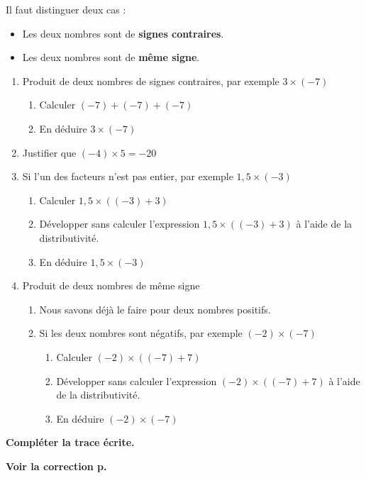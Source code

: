  \label{N1activite003}
\begin{activite}           
    Il faut distinguer deux cas :
    \begin{itemize}
        \item Les deux nombres sont de \textbf{signes contraires}.
        \item Les deux nombres sont de \textbf{même signe}.
    \end{itemize}

    \begin{enumerate}
        \item Produit de deux nombres de signes contraires, par exemple $3\times(-7)$
        \begin{enumerate}
            \item Calculer $(-7)+(-7)+(-7)$
            \item En déduire $3\times (-7)$
        \end{enumerate}
        \item Justifier que $(-4)\times 5=-20$
        \item Si l'un des facteurs n'est pas entier, par exemple $1,5\times (-3)$
        \begin{enumerate}
            \item Calculer $1,5\times ((-3)+3)$
            \item Développer sans calculer l'expression $1,5\times ((-3)+3)$ à l'aide de la distributivité.
            \item En déduire $1,5\times (-3)$
        \end{enumerate}
        \item Produit de deux nombres de même signe
        \begin{enumerate}
            \item Nous savons déjà le faire pour deux nombres positifs.
            \item Si les deux nombres sont négatifs, par exemple $(-2)\times (-7)$
            \begin{enumerate}
                \item Calculer $(-2)\times ((-7)+7)$
                \item Développer sans calculer l'expression $(-2)\times ((-7)+7)$ à l'aide de la distributivité.
                \item En déduire $(-2)\times (-7)$
            \end{enumerate}
        \end{enumerate}
    \end{enumerate}

    \textbf{Compléter la trace écrite.}

    \textbf{Voir la correction p. \hyperref[corrN1activite003]{\pageref{corrN1activite003}}}

\end{activite}
